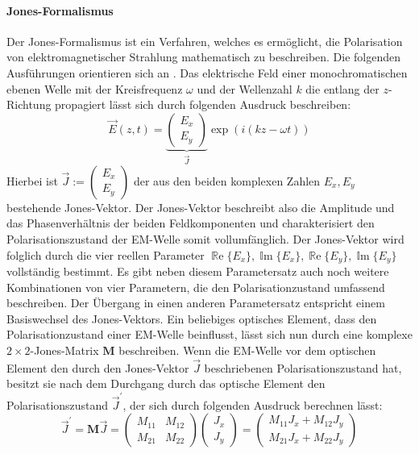 \documentclass[titlepage,  ngerman]{article}
\renewcommand{\Re}{\operatorname{\mathbb{R}e}}
\renewcommand{\Im}{\operatorname{\mathbb{I}m}}
\begin{document}
	\paragraph{Jones-Formalismus}
	Der Jones-Formalismus ist ein Verfahren, welches es ermöglicht, die Polarisation von elektromagnetischer Strahlung mathematisch zu beschreiben. Die folgenden Ausführungen orientieren sich an \cite{Hecht.2018}. Das elektrische Feld einer monochromatischen ebenen Welle mit der Kreisfrequenz $\omega$ und der Wellenzahl $k$ die entlang der $z$-Richtung propagiert lässt sich durch folgenden Ausdruck beschreiben:
	\begin{equation}
		\vec{E}(z, t) = \underbrace{\begin{pmatrix}E_x \\ E_y\end{pmatrix}}_{\vec{J}} \exp(i(kz-\omega t))
	\end{equation}
	Hierbei ist $\vec{J} := \begin{pmatrix}E_x \\ E_y\end{pmatrix}$ der aus den beiden komplexen Zahlen $E_x, E_y$ bestehende Jones-Vektor. Der Jones-Vektor beschreibt also die Amplitude und das Phasenverhältnis der beiden Feldkomponenten und charakterisiert den Polarisationszustand der EM-Welle somit vollumfänglich. Der Jones-Vektor wird folglich durch die vier reellen Parameter $\Re\{E_x\}, \Im\{E_x\}, \Re\{E_y\}, \Im\{E_y\}$ vollständig bestimmt. Es gibt neben diesem Parametersatz auch noch weitere Kombinationen von vier Parametern, die den Polarisationzustand umfassend beschreiben. Der Übergang in einen anderen Parametersatz entspricht einem Basiswechsel des Jones-Vektors.	Ein beliebiges optisches Element, dass den Polarisationzustand einer EM-Welle beinflusst, lässt sich nun durch eine komplexe $2 \times 2$-Jones-Matrix $\boldsymbol{M}$ beschreiben. Wenn die EM-Welle vor dem optischen Element den durch den Jones-Vektor $\vec{J}$ beschriebenen Polarisationszustand hat, besitzt sie nach dem Durchgang durch das optische Element den Polarisationszustand $\vec{J}^\prime$, der sich durch folgenden Ausdruck berechnen lässt:
	\begin{equation}
		\vec{J}^\prime = \boldsymbol{M} \vec{J}  =  
		\begin{pmatrix}
			M_{11} & M_{12} \\
			M_{21} & M_{22}
		\end{pmatrix}
		\begin{pmatrix}
			J_x \\
			J_y
		\end{pmatrix} = 
		\begin{pmatrix}
			M_{11} J_x + M_{12} J_y \\
			M_{21} J_x + M_{22} J_y
		\end{pmatrix}		
	\end{equation}
\end{document}
